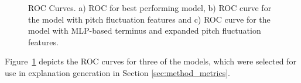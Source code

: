 \documentclass{article}
\begin{document}
\begin{figure}
    \centering
    \caption{ROC Curves. a) ROC for best performing model, b) ROC curve for the model with pitch fluctuation features and c) ROC curve for the model with MLP-based terminus and expanded pitch fluctuation features.}
    \label{ROC_curves}
\end{figure}

Figure~\ref{ROC_curves} depicts the ROC curves for three of the models, which were selected for use in explanation generation in Section \ref{sec:method_metrics}.
\end{document}
